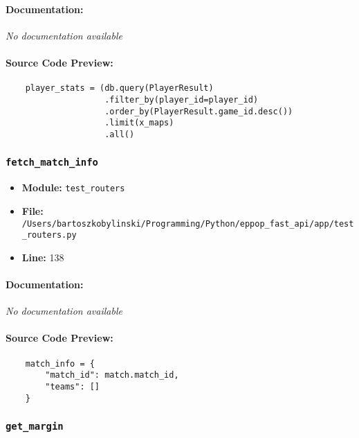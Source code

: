 \documentclass[11pt,a4paper]{article}
\begin{document}
\paragraph{Documentation:} \textit{No documentation available}

\paragraph{Source Code Preview:}
\begin{verbatim}
    player_stats = (db.query(PlayerResult)
                    .filter_by(player_id=player_id)
                    .order_by(PlayerResult.game_id.desc())
                    .limit(x_maps)
                    .all()
\end{verbatim}

\vspace{1em}
\subsubsection{\texttt{fetch\_match\_info}}

\begin{itemize}
    \item \textbf{Module:} \texttt{test\_routers}
    \item \textbf{File:} \texttt{/Users/bartoszkobylinski/Programming/Python/eppop\_fast\_api/app/test\_routers.py}
    \item \textbf{Line:} 138
\end{itemize}

\paragraph{Documentation:} \textit{No documentation available}

\paragraph{Source Code Preview:}
\begin{verbatim}
    match_info = {
        "match_id": match.match_id,
        "teams": []
    }

\end{verbatim}

\vspace{1em}
\subsubsection{\texttt{get\_margin}}
\end{document}
